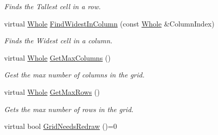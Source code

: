\begin{DoxyCompactItemize}
\begin{DoxyCompactList}\small\item\em Finds the Tallest cell in a row. \item\end{DoxyCompactList}\item 
\hypertarget{classMezzanine_1_1UI_1_1CellGrid_af72a0421cd05d091c44a85460c10ebdd}{
virtual \hyperlink{namespaceMezzanine_adcbb6ce6d1eb4379d109e51171e2e493}{Whole} \hyperlink{classMezzanine_1_1UI_1_1CellGrid_af72a0421cd05d091c44a85460c10ebdd}{FindWidestInColumn} (const \hyperlink{namespaceMezzanine_adcbb6ce6d1eb4379d109e51171e2e493}{Whole} \&ColumnIndex)}
\label{classMezzanine_1_1UI_1_1CellGrid_af72a0421cd05d091c44a85460c10ebdd}

\begin{DoxyCompactList}\small\item\em Finds the Widest cell in a column. \item\end{DoxyCompactList}\item 
\hypertarget{classMezzanine_1_1UI_1_1CellGrid_ac5d76972d021f3b78961219443ad5b5c}{
virtual \hyperlink{namespaceMezzanine_adcbb6ce6d1eb4379d109e51171e2e493}{Whole} \hyperlink{classMezzanine_1_1UI_1_1CellGrid_ac5d76972d021f3b78961219443ad5b5c}{GetMaxColumns} ()}
\label{classMezzanine_1_1UI_1_1CellGrid_ac5d76972d021f3b78961219443ad5b5c}

\begin{DoxyCompactList}\small\item\em Gest the max number of columns in the grid. \item\end{DoxyCompactList}\item 
\hypertarget{classMezzanine_1_1UI_1_1CellGrid_a6e415f61475b3b9f783584698f0a2dc2}{
virtual \hyperlink{namespaceMezzanine_adcbb6ce6d1eb4379d109e51171e2e493}{Whole} \hyperlink{classMezzanine_1_1UI_1_1CellGrid_a6e415f61475b3b9f783584698f0a2dc2}{GetMaxRows} ()}
\label{classMezzanine_1_1UI_1_1CellGrid_a6e415f61475b3b9f783584698f0a2dc2}

\begin{DoxyCompactList}\small\item\em Gets the max number of rows in the grid. \item\end{DoxyCompactList}\item 
\hypertarget{classMezzanine_1_1UI_1_1CellGrid_acb276910ecadf24d10b079a47997c0b2}{
virtual bool \hyperlink{classMezzanine_1_1UI_1_1CellGrid_acb276910ecadf24d10b079a47997c0b2}{GridNeedsRedraw} ()=0}
\label{classMezzanine_1_1UI_1_1CellGrid_acb276910ecadf24d10b079a47997c0b2}


\end{DoxyCompactItemize}
